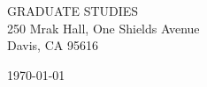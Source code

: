 \begin{minipage}{0.49\textwidth}
\begin{flushleft}
\noindent 
GRADUATE STUDIES \\
250 Mrak Hall, One Shields Avenue \\
Davis, CA 95616
\end{flushleft}
\end{minipage}
\begin{minipage}{0.47\textwidth}
\begin{flushright}
\today
\end{flushright}
\end{minipage} \\

\newcommand{\univ}{University of California, Davis}
\newcommand{\univshort}{UC Davis}
\newcommand{\degree}{Ph.D.}
\newcommand{\dept}{Computer Science}
